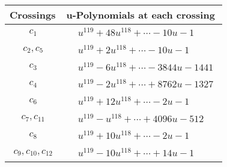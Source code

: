 \documentclass[1p]{elsarticle_modified}
\theoremstyle{definition}
\begin{document}
\begin{tabular}{m{50pt}|m{274pt}}
Crossings & \hspace{64pt}u-Polynomials at each crossing \\
\hline $$\begin{aligned}c_{1}\end{aligned}$$&$\begin{aligned}
&u^{119}+48 u^{118}+\cdots-10 u-1
\end{aligned}$\\
\hline $$\begin{aligned}c_{2},c_{5}\end{aligned}$$&$\begin{aligned}
&u^{119}+2 u^{118}+\cdots-10 u-1
\end{aligned}$\\
\hline $$\begin{aligned}c_{3}\end{aligned}$$&$\begin{aligned}
&u^{119}-6 u^{118}+\cdots-3844 u-1441
\end{aligned}$\\
\hline $$\begin{aligned}c_{4}\end{aligned}$$&$\begin{aligned}
&u^{119}-2 u^{118}+\cdots+8762 u-1327
\end{aligned}$\\
\hline $$\begin{aligned}c_{6}\end{aligned}$$&$\begin{aligned}
&u^{119}+12 u^{118}+\cdots-2 u-1
\end{aligned}$\\
\hline $$\begin{aligned}c_{7},c_{11}\end{aligned}$$&$\begin{aligned}
&u^{119}- u^{118}+\cdots+4096 u-512
\end{aligned}$\\
\hline $$\begin{aligned}c_{8}\end{aligned}$$&$\begin{aligned}
&u^{119}+10 u^{118}+\cdots-2 u-1
\end{aligned}$\\
\hline $$\begin{aligned}c_{9},c_{10},c_{12}\end{aligned}$$&$\begin{aligned}
&u^{119}-10 u^{118}+\cdots+14 u-1
\end{aligned}$\\
\hline
\end{tabular}\\~\\
\end{document}
